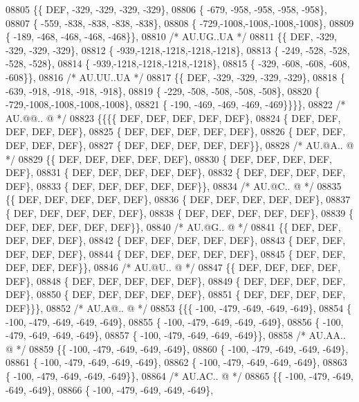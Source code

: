 \begin{DoxyCode}
08805 \{\{  DEF, -329, -329, -329, -329\},
08806 \{ -679, -958, -958, -958, -958\},
08807 \{ -559, -838, -838, -838, -838\},
08808 \{ -729,-1008,-1008,-1008,-1008\},
08809 \{ -189, -468, -468, -468, -468\}\},
08810 \textcolor{comment}{/* AU.UG..UA */}
08811 \{\{  DEF, -329, -329, -329, -329\},
08812 \{ -939,-1218,-1218,-1218,-1218\},
08813 \{ -249, -528, -528, -528, -528\},
08814 \{ -939,-1218,-1218,-1218,-1218\},
08815 \{ -329, -608, -608, -608, -608\}\},
08816 \textcolor{comment}{/* AU.UU..UA */}
08817 \{\{  DEF, -329, -329, -329, -329\},
08818 \{ -639, -918, -918, -918, -918\},
08819 \{ -229, -508, -508, -508, -508\},
08820 \{ -729,-1008,-1008,-1008,-1008\},
08821 \{ -190, -469, -469, -469, -469\}\}\}\},
08822 \textcolor{comment}{/* AU.@@.. @ */}
08823 \{\{\{\{  DEF,  DEF,  DEF,  DEF,  DEF\},
08824 \{  DEF,  DEF,  DEF,  DEF,  DEF\},
08825 \{  DEF,  DEF,  DEF,  DEF,  DEF\},
08826 \{  DEF,  DEF,  DEF,  DEF,  DEF\},
08827 \{  DEF,  DEF,  DEF,  DEF,  DEF\}\},
08828 \textcolor{comment}{/* AU.@A.. @ */}
08829 \{\{  DEF,  DEF,  DEF,  DEF,  DEF\},
08830 \{  DEF,  DEF,  DEF,  DEF,  DEF\},
08831 \{  DEF,  DEF,  DEF,  DEF,  DEF\},
08832 \{  DEF,  DEF,  DEF,  DEF,  DEF\},
08833 \{  DEF,  DEF,  DEF,  DEF,  DEF\}\},
08834 \textcolor{comment}{/* AU.@C.. @ */}
08835 \{\{  DEF,  DEF,  DEF,  DEF,  DEF\},
08836 \{  DEF,  DEF,  DEF,  DEF,  DEF\},
08837 \{  DEF,  DEF,  DEF,  DEF,  DEF\},
08838 \{  DEF,  DEF,  DEF,  DEF,  DEF\},
08839 \{  DEF,  DEF,  DEF,  DEF,  DEF\}\},
08840 \textcolor{comment}{/* AU.@G.. @ */}
08841 \{\{  DEF,  DEF,  DEF,  DEF,  DEF\},
08842 \{  DEF,  DEF,  DEF,  DEF,  DEF\},
08843 \{  DEF,  DEF,  DEF,  DEF,  DEF\},
08844 \{  DEF,  DEF,  DEF,  DEF,  DEF\},
08845 \{  DEF,  DEF,  DEF,  DEF,  DEF\}\},
08846 \textcolor{comment}{/* AU.@U.. @ */}
08847 \{\{  DEF,  DEF,  DEF,  DEF,  DEF\},
08848 \{  DEF,  DEF,  DEF,  DEF,  DEF\},
08849 \{  DEF,  DEF,  DEF,  DEF,  DEF\},
08850 \{  DEF,  DEF,  DEF,  DEF,  DEF\},
08851 \{  DEF,  DEF,  DEF,  DEF,  DEF\}\}\},
08852 \textcolor{comment}{/* AU.A@.. @ */}
08853 \{\{\{ -100, -479, -649, -649, -649\},
08854 \{ -100, -479, -649, -649, -649\},
08855 \{ -100, -479, -649, -649, -649\},
08856 \{ -100, -479, -649, -649, -649\},
08857 \{ -100, -479, -649, -649, -649\}\},
08858 \textcolor{comment}{/* AU.AA.. @ */}
08859 \{\{ -100, -479, -649, -649, -649\},
08860 \{ -100, -479, -649, -649, -649\},
08861 \{ -100, -479, -649, -649, -649\},
08862 \{ -100, -479, -649, -649, -649\},
08863 \{ -100, -479, -649, -649, -649\}\},
08864 \textcolor{comment}{/* AU.AC.. @ */}
08865 \{\{ -100, -479, -649, -649, -649\},
08866 \{ -100, -479, -649, -649, -649\},

\end{DoxyCode}

